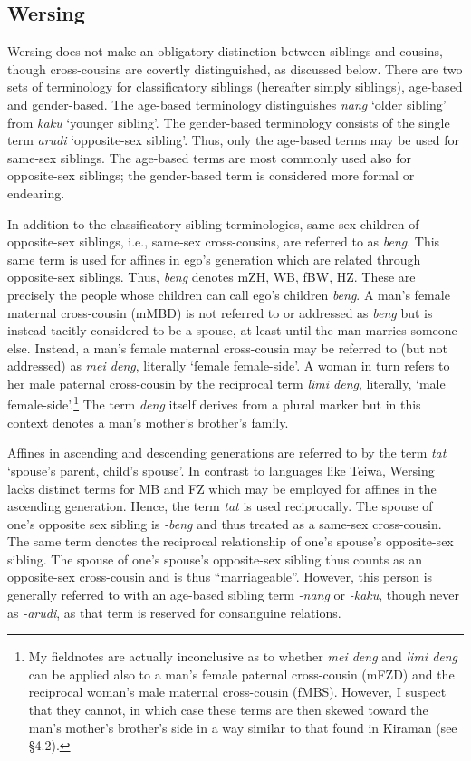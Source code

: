 \subsection{Wersing}
Wersing does not make an obligatory distinction between siblings and cousins, though cross-cousins are covertly distinguished, as discussed below. There are two sets of terminology for classificatory siblings (hereafter simply siblings), age-based and gender-based. The age-based terminology distinguishes \textit{nang} `older sibling' from \textit{kaku} `younger sibling'. The gender-based terminology consists of the single term \textit{arudi} `opposite-sex sibling'. Thus, only the age-based terms may be used for same-sex siblings. The age-based terms are most commonly used also for opposite-sex siblings; the gender-based term is considered more formal or endearing.

In addition to the classificatory sibling terminologies, same-sex children of opposite-sex siblings, i.e., same-sex cross-cousins, are referred to as \textit{beng}. This same term is used for affines in ego's generation which are related through opposite-sex siblings. Thus, \textit{beng} denotes mZH, WB, fBW, HZ. These are precisely the people whose children can call ego's children \textit{beng}. A man's female maternal cross-cousin (mMBD) is not referred to or addressed as \textit{beng} but is instead tacitly considered to be a spouse, at least until the man marries someone else. Instead, a man's female maternal cross-cousin may be referred to (but not addressed) as \textit{mei deng}, literally `female female-side'. A woman in turn refers to her male paternal cross-cousin by the reciprocal term \textit{limi deng}, literally, `male female-side'.\footnote{{ }  My fieldnotes are actually inconclusive as to whether \textit{mei deng} and \textit{limi deng} can be applied also to a man's female paternal cross-cousin (mFZD) and the reciprocal woman's male maternal cross-cousin (fMBS). However, I suspect that they cannot, in which case these terms are then skewed toward the man's mother's brother's side in a way similar to that found in Kiraman (see {\S}4.2).}  The term \textit{deng} itself derives from a plural marker but in this context denotes a man's mother's brother's family.

Affines in ascending and descending generations are referred to by the term \textit{tat} `spouse's parent, child's spouse'. In contrast to languages like Teiwa, Wersing lacks distinct terms for MB and FZ which may be employed for affines in the ascending generation. Hence, the term \textit{tat} is used reciprocally. The spouse of one's opposite sex sibling is \textit{{}-beng} and thus treated as a same-sex cross-cousin. The same term denotes the reciprocal relationship of one's spouse's opposite-sex sibling. The spouse of one's spouse's opposite-sex sibling thus counts as an opposite-sex cross-cousin and is thus ``marriageable''. However, this person is generally referred to with an age-based sibling term \textit{{}-nang} or \textit{{}-kaku}, though never as \textit{{}-arudi}, as that term is reserved for consanguine relations.

